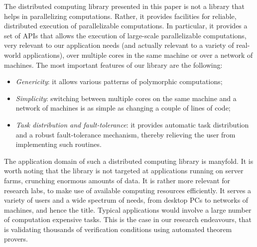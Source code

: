 \documentclass[a4paper,12pt]{article}
\begin{document}
The distributed computing library presented in this paper is not a
library that helps in parallelizing computations. Rather, it provides
facilities for reliable, distributed execution of parallelizable
computations. In particular, it provides a set of APIs that allows the
execution of large-scale parallelizable computations, very relevant to
our application needs (and actually relevant to a variety of
real-world applications), over multiple cores in the same machine or
over a network of machines. 
The most important features of our library are the following:
\begin{itemize}
\item \emph{Genericity}: 
  it allows various patterns of polymorphic computations;
\item \emph{Simplicity}: switching between multiple cores on the same
  machine and a network of machines is as simple as changing a couple
  of lines of code;
\item \emph{Task distribution and fault-tolerance}: 
  it provides automatic task distribution and
  a robust fault-tolerance mechanism, thereby
  relieving the user from implementing such routines.
\end{itemize}
The application domain of such a distributed computing library is manyfold. 
It is worth noting that the library is not targeted at applications
running on server farms, crunching enormous amounts of data. 
It is rather more relevant for research labs, to make use of available
computing resources efficiently. It serves a variety of users and a wide
spectrum of needs, from desktop PCs to networks of machines, and hence
the title.
Typical applications would involve a large number
of computation expensive tasks.
This is the case in our
research endeavours, that is validating thousands of verification
conditions using automated theorem provers. 
\end{document}
